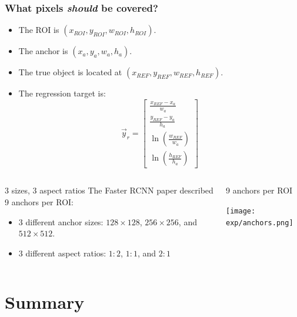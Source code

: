 \documentclass{beamer}
\begin{document}
\begin{frame}
  \frametitle{What pixels {\bf\em should} be covered?}

  \begin{itemize}
  \item The ROI is $(x_{ROI},y_{ROI},w_{ROI},h_{ROI})$.
  \item The anchor is $(x_{a},y_{a},w_{a},h_{a})$.
  \item The true object is located at $(x_{REF},y_{REF},w_{REF},h_{REF})$.
  \item The regression  target is:
    \[
    \vec{y}_r = \left[\begin{array}{c}
        \frac{x_{REF}-x_{a}}{w_{a}}\\
        \frac{y_{REF}-y_{a}}{h_{a}}\\
        \ln\left(\frac{w_{REF}}{w_{a}}\right)\\
        \ln\left(\frac{h_{REF}}{h_{a}}\right)
      \end{array}\right]
    \]
  \end{itemize}
\end{frame}

\begin{frame}
  \begin{columns}
    \column{1.75in}
    \begin{block}{3 sizes, 3 aspect ratios}
      The Faster RCNN paper described 9 anchors per ROI:
      \begin{itemize}
      \item 3 different anchor sizes: $128\times 128$, $256\times
        256$, and $512\times 512$.
      \item 3 different aspect ratios: $1:2$, $1:1$, and $2:1$
      \end{itemize}
    \end{block}
    \column{2.75in}
    \begin{block}{9 anchors per ROI}
      \centerline{\texttt{[image: exp/anchors.png]}}
    \end{block}
  \end{columns}
\end{frame}

\section{Summary}
\setcounter{subsection}{1}
\end{document}
